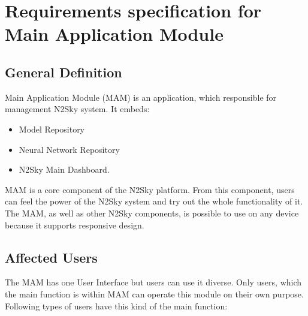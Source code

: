 
\section{Requirements specification for Main Application Module}\label{Requirements specifications for Main Application Module}
\subsection{General Definition}\label{GeneralDefinition main}
Main Application Module (MAM) is an application, which responsible for management N2Sky system. It embeds:
\begin{itemize}
\item Model Repository 
\item Neural Network Repository 
\item N2Sky Main Dashboard.
\end{itemize}

MAM is a core component of the N2Sky platform. From this component, users can feel the power of the N2Sky system and try out the whole functionality of it. The MAM, as well as other N2Sky components, is possible to use on any device because it supports responsive design. 

\subsection{Affected Users}\label{Affected users MAM}
The MAM has one User Interface but users can use it diverse. Only users, which the main function is within MAM can operate this module on their own purpose. Following types of users have this kind of the main function:

